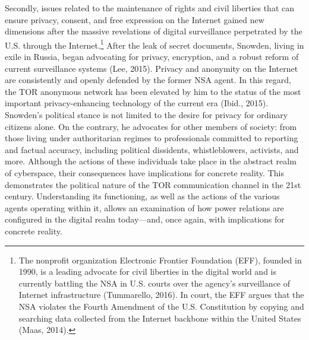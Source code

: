 Secondly, issues related to the maintenance of rights and civil liberties that can ensure privacy, consent, and free expression on the Internet gained new dimensions after the massive revelations of digital surveillance perpetrated by the U.S. through the Internet.\footnote{The nonprofit organization Electronic Frontier Foundation (EFF), founded in 1990, is a leading advocate for civil liberties in the digital world and is currently battling the NSA in U.S. courts over the agency's surveillance of Internet infrastructure (Tummarello, 2016). In court, the EFF argues that the NSA violates the Fourth Amendment of the U.S. Constitution by copying and searching data collected from the Internet backbone within the United States (Maas, 2014).}
After the leak of secret documents, Snowden, living in exile in Russia, began advocating for privacy, encryption, and a robust reform of current surveillance systems (Lee, 2015). Privacy and anonymity on the Internet are consistently and openly defended by the former NSA agent. In this regard, the TOR anonymous network has been elevated by him to the status of the most important privacy-enhancing technology of the current era (Ibid., 2015).
Snowden's political stance is not limited to the desire for privacy for ordinary citizens alone. On the contrary, he advocates for other members of society: from those living under authoritarian regimes to professionals committed to reporting and factual accuracy, including political dissidents, whistleblowers, activists, and more. Although the actions of these individuals take place in the abstract realm of cyberspace, their consequences have implications for concrete reality. This demonstrates the political nature of the TOR communication channel in the 21st century. Understanding its functioning, as well as the actions of the various agents operating within it, allows an examination of how power relations are configured in the digital realm today—and, once again, with implications for concrete reality.

